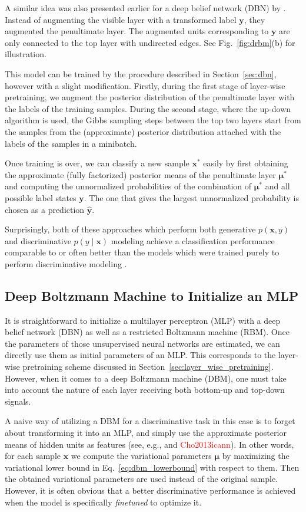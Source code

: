 \documentclass{now}
\newcommand{\vect}[1]{\mathbf{#1}}
\newcommand{\vects}[1]{\boldsymbol{#1}}
\newcommand{\vx}[0]{\vect{x}}
\newcommand{\vy}[0]{\vect{y}}
\newcommand{\vmu}[0]{\vects{\mu}}
\newcommand{\alert}[1]{\textcolor{red}{#1}}
\newcommand{\citepub}[1]{\alert{#1}}
\begin{document}
A similar idea was also presented earlier for a deep belief
network (DBN) by \citet{Hinton2006nc}. Instead of augmenting
the visible layer with a transformed label $\vy$, they
augmented the penultimate layer. The augmented units
corresponding to $\vy$ are only connected to the top layer
with undirected edges. See Fig.~\ref{fig:drbm}(b) for
illustration.

This model can be trained by the procedure described in
Section~\ref{sec:dbn}, however with a slight modification.
Firstly, during the first stage of layer-wise pretraining,
we augment the posterior distribution of the penultimate
layer with the labels of the training samples. During the
second stage, where the up-down algorithm is used, the Gibbs
sampling steps between the top two layers start from the
samples from the (approximate) posterior distribution
attached with the labels of the samples in a minibatch. 

Once training is over, we can classify a new sample $\vx^*$
easily by first obtaining the approximate (fully factorized)
posterior means of the penultimate layer $\vmu^*$ and
computing the unnormalized probabilities of the combination
of $\vmu^*$ and all possible label states $\vy$. The one
that gives the largest unnormalized probability is
chosen as a prediction $\hat{\vy}$.

Surprisingly, both of these approaches which perform both
generative $p(\vx, y)$ and discriminative $p(y \mid \vx)$
modeling achieve a classification performance comparable
to or often better than the models which were trained
purely to perform discriminative modeling
\citep{Hinton2006nc,Larochelle2008}.

\subsection{Deep Boltzmann Machine to Initialize an MLP}
\label{sec:mlp_dbm}

It is straightforward to initialize a multilayer perceptron
(MLP) with a deep belief network (DBN) as well as a
restricted Boltzmann machine (RBM). Once the parameters of
those unsupervised neural networks are estimated, we can
directly use them as initial parameters of an MLP. This
corresponds to the layer-wise pretraining scheme discussed
in Section~\ref{sec:layer_wise_pretraining}.  However, when
it comes to a deep Boltzmann machine (DBM), one must take
into account the nature of each layer receiving both
bottom-up and top-down signals.

A naive way of utilizing a DBM for a discriminative task in
this case is to forget about transforming it into an MLP,
and simply use the approximate posterior means of hidden
units as features (see, e.g., \citet{Montavon2012ai} and
\citepub{Cho2013icann}). In other words, for
each sample $\vx$ we compute the variational parameters
$\vmu$ by maximizing the variational lower bound in
Eq.~\eqref{eq:dbm_lowerbound} with respect to them. Then
the obtained variational parameters are used instead of the
original sample.  However, it is often obvious that a
better discriminative performance is achieved when the model
is specifically \textit{finetuned} to optimize it.
\end{document}
